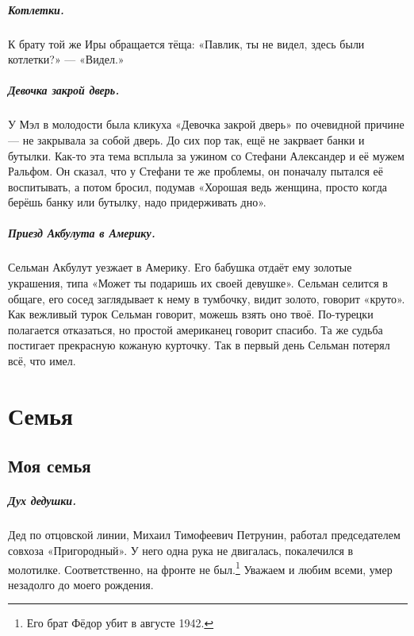 \documentclass{book}
\begin{document}
\paragraph{Котлетки.}
К брату той же Иры обращается тёща:
«Павлик, ты не видел, здесь были котлетки?» --- «Видел.»

\paragraph{Девочка закрой дверь.}
У Мэл в молодости была кликуха «Девочка закрой дверь» по очевидной причине --- не закрывала за собой дверь.
До сих пор так, ещё не закрвает банки и бутылки.
Как-то эта тема всплыла за ужином со Стефани Александер и её мужем Ральфом.
Он сказал, что у Стефани те же проблемы, он поначалу пытался её воспитывать, а потом бросил, подумав «Хорошая ведь женщина, просто когда берёшь банку или бутылку, надо придерживать дно».

\paragraph{Приезд Акбулута в Америку.}
Сельман Акбулут уезжает в Америку.
Его бабушка отдаёт ему золотые украшения, типа «Может ты подаришь их своей девушке».
Сельман селится в общаге, его сосед заглядывает к нему в тумбочку, видит золото, говорит «круто».
Как вежливый турок Сельман говорит, можешь взять оно твоё.
По-турецки полагается отказаться, но простой американец говорит спасибо.
Та же судьба постигает прекрасную кожаную курточку.
Так в первый день Сельман потерял всё, что имел.



\chapter*{Семья}

\section*{Моя семья}

\paragraph{Дух дедушки.}
Дед по отцовской линии, Михаил Тимофеевич Петрунин, работал председателем совхоза «Пригородный».
У него одна рука не двигалась, покалечился в молотилке.
Соответственно, на фронте не был.\footnote{Его брат Фёдор убит в августе 1942.}
Уважаем и любим всеми, умер незадолго до моего рождения.
\end{document}
